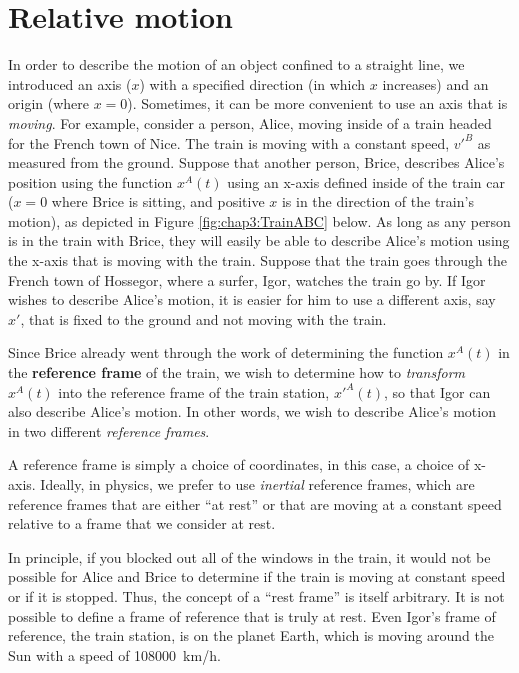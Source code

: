 \section{Relative motion}
In order to describe the motion of an object confined to a straight line, we introduced an axis ($x$) with a specified direction (in which $x$ increases) and an origin (where $x=0$). Sometimes, it can be more convenient to use an axis that is \textit{moving}. For example, consider a person, Alice, moving inside of a train headed for the French town of Nice. The train is moving with a constant speed, $v'^B$ as measured from the ground. Suppose that another person, Brice, describes Alice's position using the function $x^A(t)$ using an x-axis defined inside of the train car ($x=0$ where Brice is sitting, and positive $x$ is in the direction of the train's motion), as depicted in Figure \ref{fig:chap3:TrainABC} below. As long as any person is in the train with Brice, they will easily be able to describe Alice's motion using the x-axis that is moving with the train. Suppose that the train goes through the French town of Hossegor, where a surfer, Igor, watches the train go by. If Igor wishes to describe Alice's motion, it is easier for him to use a different axis, say $x'$, that is fixed to the ground and not moving with the train. 

Since Brice already went through the work of determining the function $x^A(t)$ in the \textbf{reference frame} of the train, we wish to determine how to \textit{transform} $x^A(t)$ into the reference frame of the train station, $x'^A(t)$, so that Igor can also describe Alice's motion. In other words, we wish to describe Alice's motion in two different \textit{reference frames}.


A reference frame is simply a choice of coordinates, in this case, a choice of x-axis. Ideally, in physics, we prefer to use \textit{inertial} reference frames, which are reference frames that are either ``at rest'' or that are moving at a constant speed relative to a frame that we consider at rest.
 
 
In principle, if you blocked out all of the windows in the train, it would not be possible for Alice and Brice to determine if the train is moving at constant speed or if it is stopped. Thus, the concept of a ``rest frame'' is itself arbitrary. It is not possible to define a frame of reference that is truly at rest. Even Igor's frame of reference, the train station, is on the planet Earth, which is moving around the Sun with a speed of \SI{108000}{km/h}.


